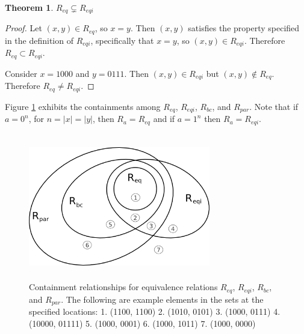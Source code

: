 \documentclass{article}
\newtheorem{theorem}{Theorem}[section]
\newtheorem{lemma}{Lemma}[section]
\theoremstyle{definition}
\newcommand{\sigmastar}{\Sigma^{*}}
\begin{document}
\begin{theorem}$R_{eq} \subsetneq R_{eqi}$\end{theorem}
\begin{proof}
  Let $(x,y)\in R_{eq}$, so $x=y$. Then $(x,y)$ satisfies the property
  specified in the definition of $R_{eqi}$, specifically that $x=y$, so
  $(x,y) \in R_{eqi}$. Therefore $R_{eq} \subset R_{eqi}$.

  Consider $x=1000$ and $y=0111$. Then $(x,y)\in R_{eqi}$ but $(x,y) \notin
  R_{eq}$. Therefore $R_{eq} \neq R_{eqi}$.
\end{proof}

Figure \ref{fig:containments} exhibits the containments among $R_{eq}$,
$R_{eqi}$, $R_{bc}$, and $R_{par}$. Note that if $a=0^n$, for $n=|x|=|y|$, then
$R_{a}=R_{eq}$ and if $a=1^n$ then $R_{a}=R_{eqi}$.


\begin{figure}
  \begin{center}
    \includegraphics[width=300px,height=241px,keepaspectratio=true]
                    {containments.png}
  \end{center}
  \caption{ \label{fig:containments} Containment relationships for equivalence
    relations $R_{eq}$, $R_{eqi}$, $R_{bc}$, and $R_{par}$. The following are
    example elements in the sets at the specified locations: 1. (1100, 1100)
    2. (1010, 0101) 3. (1000, 0111) 4. (10000, 01111) 5. (1000, 0001) 6. (1000,
    1011) 7. (1000, 0000) }
\end{figure}
\end{document}
